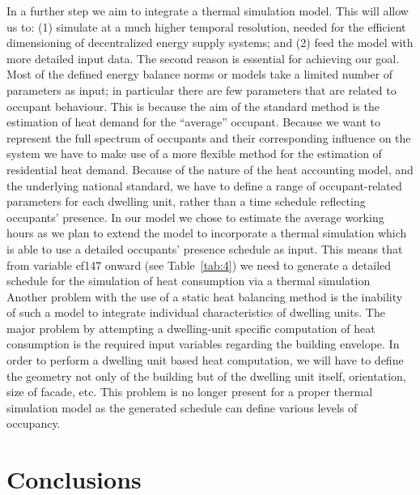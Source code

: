 \documentclass[11pt]{IJM-article}
\begin{document}
In a further step we aim to integrate a thermal simulation model. This will
allow us to: (1) simulate at a much higher temporal resolution, needed for the
efficient dimensioning of decentralized energy supply systems; and (2) feed the
model with more detailed input data. The second reason is essential for
achieving our goal. Most of the defined energy balance norms or models take a
limited number of parameters as input; in particular there are few parameters
that are related to occupant behaviour. This is because the aim of the standard
method is the estimation of heat demand for the ``average'' occupant. Because
we want to represent the full spectrum of occupants and their corresponding
influence on the system we have to make use of a more flexible method for the
estimation of residential heat demand.  Because of the nature of the heat
accounting model, and the underlying national standard, we have to define a
range of occupant-related parameters for each dwelling unit, rather than a time
schedule reflecting occupants' presence. In our model we chose to estimate the
average working hours as we plan to extend the model to incorporate a thermal
simulation which is able to use a detailed occupants’ presence schedule as
input. This means that from variable ef147 onward (see Table~\ref{tab:4}) we
need to generate a detailed schedule for the simulation of heat consumption via
a thermal simulation   Another problem with the
use of a static heat balancing method is the inability of such a model to
integrate individual characteristics of dwelling units. The major problem by
attempting a dwelling-unit specific computation of heat consumption is the
required input variables regarding the building envelope. In order to perform a
dwelling unit based heat computation, we will have to define the geometry not
only of the building but of the dwelling unit itself, orientation, size of
facade, etc. This problem is no longer present for a proper thermal simulation
model as the generated schedule can define various levels of occupancy.\\

\section{Conclusions}
\label{sec:10}
\end{document}
